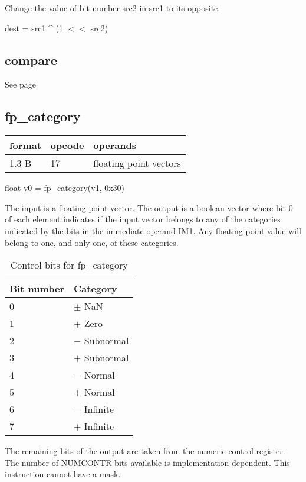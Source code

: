 \documentclass[forwardcom.tex]{subfiles}
\begin{document}
Change the value of bit number src2 in src1 to its opposite.
\vv

dest = src1 \^{} (1 $<<$ src2)
\vv


\subsection{compare}
See page \pageref{table:compareInstruction}
\vv


\subsection{fp\_category}
\label{table:fpCategoryInstruction}
\begin{tabular}{|p{12mm}|p{15mm}|p{100mm}|}
\hline
\bfseries format & \bfseries opcode & \bfseries operands \\ \hline
1.3 B & 17 & floating point vectors \\ \hline
\end{tabular}
\vv

float v0 = fp\_category(v1, 0x30)
\vv

The input is a floating point vector. The output is a boolean vector where bit 0 of each element indicates if the input vector belongs to any of the categories indicated by the bits in the immediate operand IM1. Any floating point value will belong to one, and only one, of these categories. 
\vv

\begin{longtable} {|p{24mm}|p{90mm}|}
\caption{Control bits for fp\_category} 
\label{table:fpCategoryInstructionBits} \\
\endfirsthead
\endhead
\hline
\bfseries Bit number & \bfseries Category  \\
\hline
0 & $\pm$ NaN \\
1 & $\pm$ Zero \\
2 & $-$ Subnormal \\
3 & $+$ Subnormal \\
4 & $-$ Normal \\
5 & $+$ Normal \\
6 & $-$ Infinite  \\
7 & $+$ Infinite  \\
\hline
\end{longtable}
\vv

The remaining bits of the output are taken from the numeric control register. The number of NUMCONTR bits available is implementation dependent. This instruction cannot have a mask.
\vv
\end{document}
